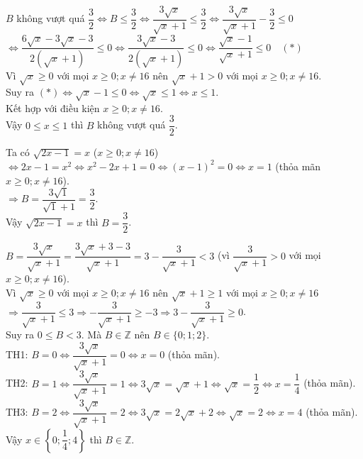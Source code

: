 \begin{bt}
{\begin{cacy}
\item $B$ không vượt quá $\dfrac{3}{2} \Leftrightarrow B \le \dfrac{3}{2} \Leftrightarrow \dfrac{3\sqrt{x}}{\sqrt{x}+1} \le \dfrac{3}{2} \Leftrightarrow \dfrac{3\sqrt{x}}{\sqrt{x}+1} - \dfrac{3}{2} \le 0$\\
$\Leftrightarrow \dfrac{6\sqrt{x}-3\sqrt{x}-3}{2\left(\sqrt{x}+1\right)} \le 0 \Leftrightarrow \dfrac{3\sqrt{x}-3}{2\left(\sqrt{x}+1\right)} \le 0 \Leftrightarrow \dfrac{\sqrt{x}-1}{\sqrt{x}+1} \le 0 \quad (*)$\\
Vì $\sqrt{x} \ge 0$ với mọi $x \ge 0; x \ne 16$ nên $\sqrt{x}+1 > 0$ với mọi $x \ge 0; x \ne 16$.\\
Suy ra $(*)\Leftrightarrow \sqrt{x}-1 \le 0 \Leftrightarrow \sqrt{x} \le 1 \Leftrightarrow x \le 1$.\\
Kết hợp với điều kiện $x \ge 0; x \ne 16$.\\
Vậy $0 \le x \le 1$ thì $B$ không vượt quá $\dfrac{3}{2}$.

\item Ta có $\sqrt{2x-1} = x$ ($x \ge 0; x \ne 16$) $\Leftrightarrow 2x-1 = x^2 \Leftrightarrow x^2-2x+1 = 0 \Leftrightarrow (x-1)^2 = 0 \Leftrightarrow x = 1$ (thỏa mãn $x \ge 0; x \ne 16$).\\
$\Rightarrow B = \dfrac{3\sqrt{1}}{\sqrt{1}+1} = \dfrac{3}{2}$.\\
Vậy $\sqrt{2x-1} = x$ thì $B = \dfrac{3}{2}$.

\item $B = \dfrac{3\sqrt{x}}{\sqrt{x}+1} = \dfrac{3\sqrt{x}+3-3}{\sqrt{x}+1} = 3 - \dfrac{3}{\sqrt{x}+1} < 3$ (vì $\dfrac{3}{\sqrt{x}+1} > 0$ với mọi $x \ge 0; x \ne 16$).\\
Vì $\sqrt{x} \ge 0$ với mọi $x \ge 0; x \ne 16$ nên $\sqrt{x}+1 \ge 1$ với mọi $x \ge 0; x \ne 16$\\
$\Rightarrow \dfrac{3}{\sqrt{x}+1} \le 3 \Rightarrow -\dfrac{3}{\sqrt{x}+1} \ge -3 \Rightarrow 3 - \dfrac{3}{\sqrt{x}+1} \ge 0$.\\
Suy ra $0 \le B < 3$. Mà $B \in \mathbb{Z}$ nên $B \in \{0; 1; 2\}$.\\
TH1: $B = 0 \Leftrightarrow \dfrac{3\sqrt{x}}{\sqrt{x}+1} = 0 \Leftrightarrow x = 0$ (thỏa mãn).\\
TH2: $B = 1 \Leftrightarrow \dfrac{3\sqrt{x}}{\sqrt{x}+1} = 1 \Leftrightarrow 3\sqrt{x} = \sqrt{x}+1 \Leftrightarrow \sqrt{x} = \dfrac{1}{2} \Leftrightarrow x = \dfrac{1}{4}$ (thỏa mãn).\\
TH3: $B = 2 \Leftrightarrow \dfrac{3\sqrt{x}}{\sqrt{x}+1} = 2 \Leftrightarrow 3\sqrt{x} = 2\sqrt{x}+2 \Leftrightarrow \sqrt{x} = 2 \Leftrightarrow x = 4$ (thỏa mãn).\\
Vậy $x \in \left\{0; \dfrac{1}{4}; 4\right\}$ thì $B \in \mathbb{Z}$.
\end{cacy}
}
\end{bt}
